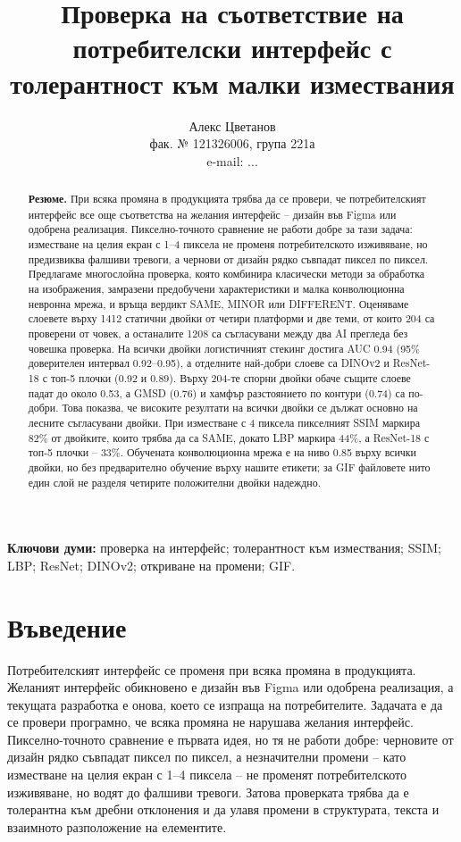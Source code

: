 \documentclass[a4paper,12pt]{article}
\title{Проверка на съответствие на потребителски интерфейс с толерантност към малки измествания}
\author{Алекс Цветанов\\
фак. № 121326006, група 221а\\
e-mail: ...}
\date{}
\begin{document}
\maketitle

\begin{abstract}
\noindent\textbf{Резюме.}
При всяка промяна в продукцията трябва да се провери, че потребителският интерфейс все още съответства на желания интерфейс – дизайн във Figma или одобрена реализация. Пикселно-точното сравнение не работи добре за тази задача: изместване на целия екран с 1–4 пиксела не променя потребителското изживяване, но предизвиква фалшиви тревоги, а чернови от дизайн рядко съвпадат пиксел по пиксел. Предлагаме многослойна проверка, която комбинира класически методи за обработка на изображения, замразени предобучени характеристики и малка конволюционна невронна мрежа, и връща вердикт SAME, MINOR или DIFFERENT. Оценяваме слоевете върху 1412 статични двойки от четири платформи и две теми, от които 204 са проверени от човек, а останалите 1208 са съгласувани между два AI прегледа без човешка проверка. На всички двойки логистичният стекинг достига AUC 0.94 (95\% доверителен интервал 0.92–0.95), а отделните най-добри слоеве са DINOv2 и ResNet-18 с топ-5 плочки (0.92 и 0.89). Върху 204-те спорни двойки обаче същите слоеве падат до около 0.53, а GMSD (0.76) и хамфър разстоянието по контури (0.74) са по-добри. Това показва, че високите резултати на всички двойки се дължат основно на лесните съгласувани двойки. При изместване с 4 пиксела пикселният SSIM маркира 82\% от двойките, които трябва да са SAME, докато LBP маркира 44\%, а ResNet-18 с топ-5 плочки – 33\%. Обучената конволюционна мрежа е на ниво 0.85 върху всички двойки, но без предварително обучение върху нашите етикети; за GIF файловете нито един слой не разделя четирите положителни двойки надеждно.
\end{abstract}

\noindent\textbf{Ключови думи:} проверка на интерфейс; толерантност към измествания; SSIM; LBP; ResNet; DINOv2; откриване на промени; GIF.

\section{Въведение}
Потребителският интерфейс се променя при всяка промяна в продукцията. Желаният интерфейс обикновено е дизайн във Figma или одобрена реализация, а текущата разработка е онова, което се изпраща на потребителите. Задачата е да се провери програмно, че всяка промяна не нарушава желания интерфейс. Пикселно-точното сравнение е първата идея, но тя не работи добре: черновите от дизайн рядко съвпадат пиксел по пиксел, а незначителни промени – като изместване на целия екран с 1–4 пиксела – не променят потребителското изживяване, но водят до фалшиви тревоги. Затова проверката трябва да е толерантна към дребни отклонения и да улавя промени в структурата, текста и взаимното разположение на елементите.
\end{document}
